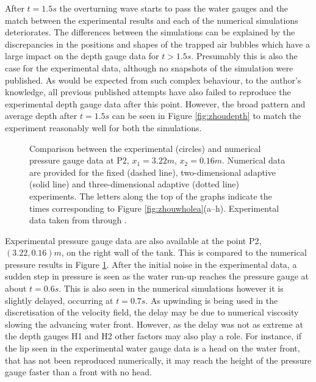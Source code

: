 After $t=1.5s$ the overturning wave starts to pass the water gauges and the match between the experimental results and each of the numerical simulations deteriorates.  The differences between the simulations can be explained by the discrepancies in the positions and shapes of the trapped air bubbles which have a large impact on the depth gauge data for $t>1.5s$.  Presumably this is also the case for the experimental data, although no snapshots of the simulation were published.  As would be expected from such complex behaviour, to the author's knowledge, all previous published attempts have also failed to reproduce the experimental depth gauge data after this point.  However, the broad pattern and average depth after $t=1.5s$ can be seen in Figure \ref{fig:zhoudepth} to match the experiment reasonably well for both the simulations.

\begin{figure}[tb]
\begin{center}

\caption{Comparison between the experimental (circles) and numerical pressure gauge data at P2, $x_1 = 3.22m$, $x_2 = 0.16m$.  Numerical data are provided for the fixed (dashed line), two-dimensional adaptive (solid line) and three-dimensional adaptive (dotted line) experiments.  The letters along the top of the graphs indicate the times corresponding to Figure \ref{fig:zhouwholea}(a--h).  Experimental data taken from \citet{zhou_nonlinear_1999} through \citet{park_volume-of-fluid_2009}.}
\label{fig:zhoupressure}
\end{center}
\end{figure}

Experimental pressure gauge data are also available at the point P2, $(3.22,0.16)m$, on the right wall of the tank.  This is compared to the numerical pressure results in Figure \ref{fig:zhoupressure}.  After the initial noise in the experimental data, a sudden step in pressure is seen as the water run-up reaches the pressure gauge at about $t=0.6s$.  This is also seen in the numerical simulations however it is slightly delayed, occurring at $t=0.7s$.  As upwinding is being used in the discretisation of the velocity field, the delay may be due to numerical viscosity slowing the advancing water front.  However, as the delay was not as extreme at the depth gauges H1 and H2 other factors may also play a role.  For instance, if the lip seen in the experimental water gauge data is a head on the water front, that has not been reproduced numerically, it may reach the height of the pressure gauge faster than a front with no head.

